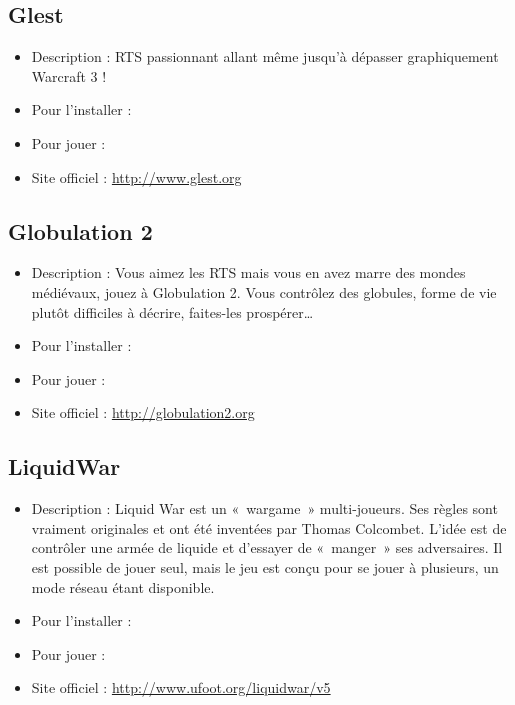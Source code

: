 \subsection{Glest}
\begin{itemize}
\begingroup
{}
\item Description : RTS passionnant allant même jusqu'à dépasser graphiquement Warcraft 3 !{\par}
\item Pour l'installer : 
\endgroup
\item Pour jouer : 
\item Site officiel : \url{http://www.glest.org}{\par}
\end{itemize}
\subsection{Globulation 2}
\begin{itemize}
\begingroup
{}
\item Description : Vous aimez les RTS mais vous en avez marre des mondes médiévaux, jouez à Globulation 2. Vous contrôlez des globules, forme de vie plutôt difficiles à décrire, faites-les prospérer\ldots{}{\par}
\item Pour l'installer : 
\item Pour jouer : 
\item Site officiel : \url{http://globulation2.org}{\par}
\endgroup
\end{itemize}
\subsection{LiquidWar}
\begin{itemize}
\begingroup
{}
\item Description : Liquid War est un «~wargame~» multi-joueurs. Ses règles sont vraiment originales et ont été inventées par Thomas Colcombet. L'idée est de contrôler une armée de liquide et d'essayer de «~manger~» ses adversaires. Il est possible de jouer seul, mais le jeu est conçu pour se jouer à plusieurs, un mode réseau étant disponible.{\par}
\item Pour l'installer : 
\item Pour jouer : 
\item Site officiel : \url{http://www.ufoot.org/liquidwar/v5}{\par}
\endgroup
\end{itemize}
